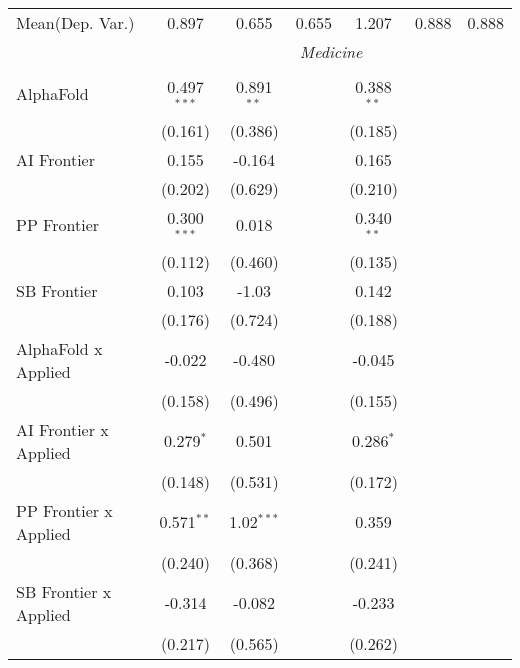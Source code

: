 \begin{tabular}{lcccccc}
Mean(Dep. Var.) & 0.897 & 0.655 & 0.655 & 1.207 & 0.888 & 0.888 \\
 & \multicolumn{6}{c}{\textit{Medicine}} \\ \\
   AlphaFold                      & 0.497$^{***}$ & 0.891$^{**}$ &               & 0.388$^{**}$ &        &   \\   
                                  & (0.161)       & (0.386)      &               & (0.185)      &        &   \\   
   AI Frontier                    & 0.155         & -0.164       &               & 0.165        &        &   \\   
                                  & (0.202)       & (0.629)      &               & (0.210)      &        &   \\   
   PP Frontier                    & 0.300$^{***}$ & 0.018        &               & 0.340$^{**}$ &        &   \\   
                                  & (0.112)       & (0.460)      &               & (0.135)      &        &   \\   
   SB Frontier                    & 0.103         & -1.03        &               & 0.142        &        &   \\   
                                  & (0.176)       & (0.724)      &               & (0.188)      &        &   \\   
   AlphaFold x Applied            & -0.022        & -0.480       &               & -0.045       &        &   \\   
                                  & (0.158)       & (0.496)      &               & (0.155)      &        &   \\   
   AI Frontier x Applied          & 0.279$^{*}$   & 0.501        &               & 0.286$^{*}$  &        &   \\   
                                  & (0.148)       & (0.531)      &               & (0.172)      &        &   \\   
   PP Frontier x Applied          & 0.571$^{**}$  & 1.02$^{***}$ &               & 0.359        &        &   \\   
                                  & (0.240)       & (0.368)      &               & (0.241)      &        &   \\   
   SB Frontier x Applied          & -0.314        & -0.082       &               & -0.233       &        &   \\   
                                  & (0.217)       & (0.565)      &               & (0.262)      &        &   \\   

\end{tabular}
